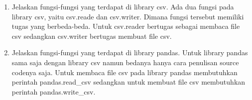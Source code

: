 \begin{enumerate}
\item Jelaskan fungsi-fungsi yang terdapat di library csv.
	\subitem Ada dua fungsi pada library csv, yaitu csv.reade dan csv.writer. Dimana fungsi tersebut memiliki tugas yang berbeda-beda. Untuk csv.reader bertugas sebagai membaca file csv sedangkan csv.writer bertugas membuat file csv.

\item Jelaskan fungsi-fungsi yang terdapat di library pandas.
	\subitem Untuk library pandas sama saja dengan library csv namun bedanya hanya cara penulisan source codenya saja. Untuk membaca file csv pada library pandas membutuhkan perintah pandas.read\_csv sedangkan untuk membuat file csv membutuhkan perintah pandas.write\_csv.

\end{enumerate}

